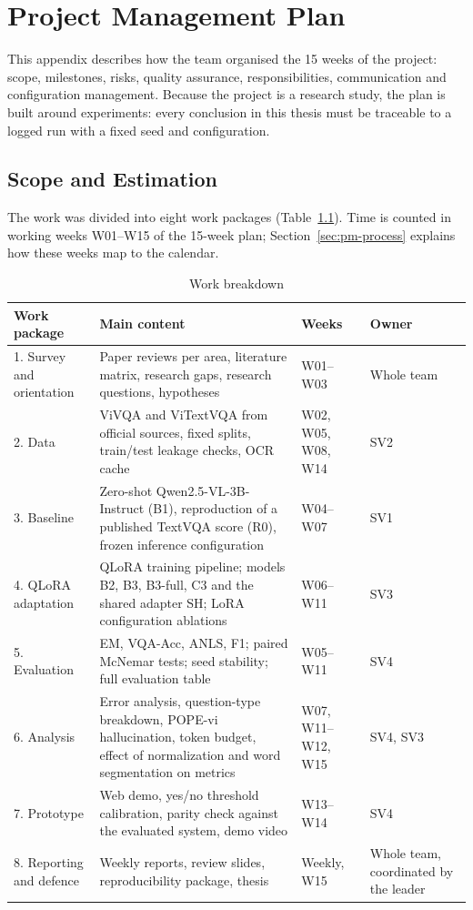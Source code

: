 
\chapter{Project Management Plan}
\label{appendix:pm}

This appendix describes how the team organised the 15 weeks of the project:
scope, milestones, risks, quality assurance, responsibilities, communication
and configuration management. Because the project is a research study, the plan
is built around experiments: every conclusion in this thesis must be traceable
to a logged run with a fixed seed and configuration.

\section{Scope and Estimation}

The work was divided into eight work packages (Table~\ref{tab:pm-wbs}). Time is
counted in working weeks W01--W15 of the 15-week plan;
Section~\ref{sec:pm-process} explains how these weeks map to the calendar.

\begin{table}[htbp]
\caption{Work breakdown}
\label{tab:pm-wbs}
\centering
\small
\begin{tabular}{p{}p{}p{}p{}}
\toprule
\textbf{Work package} & \textbf{Main content} & \textbf{Weeks} & \textbf{Owner} \\
\midrule
1. Survey and orientation & Paper reviews per area, literature matrix, research gaps, research questions, hypotheses & W01--W03 & Whole team \\
2. Data & ViVQA and ViTextVQA from official sources, fixed splits, train/test leakage checks, OCR cache & W02, W05, W08, W14 & SV2 \\
3. Baseline & Zero-shot Qwen2.5-VL-3B-Instruct (B1), reproduction of a published TextVQA score (R0), frozen inference configuration & W04--W07 & SV1 \\
4. QLoRA adaptation & QLoRA training pipeline; models B2, B3, B3-full, C3 and the shared adapter SH; LoRA configuration ablations & W06--W11 & SV3 \\
5. Evaluation & EM, VQA-Acc, ANLS, F1; paired McNemar tests; seed stability; full evaluation table & W05--W11 & SV4 \\
6. Analysis & Error analysis, question-type breakdown, POPE-vi hallucination, token budget, effect of normalization and word segmentation on metrics & W07, W11--W12, W15 & SV4, SV3 \\
7. Prototype & Web demo, yes/no threshold calibration, parity check against the evaluated system, demo video & W13--W14 & SV4 \\
8. Reporting and defence & Weekly reports, review slides, reproducibility package, thesis & Weekly, W15 & Whole team, coordinated by the leader \\
\bottomrule
\end{tabular}
\end{table}

